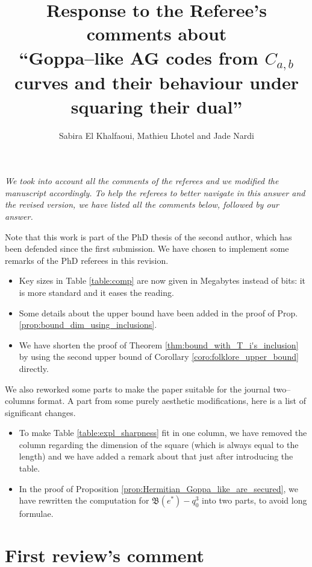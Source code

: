 \documentclass[12pt,a4paper]{amsart}
\title[Goppa--like AG codes from $C_{a,b}$ curves and their behaviour under squaring their dual]{Response to the Referee's comments about  \\ ``Goppa--like AG codes from $C_{a,b}$ curves and their behaviour under squaring their dual''}
\author{Sabira El Khalfaoui, Mathieu Lhotel and Jade Nardi}
\begin{document}
\maketitle

{\itshape
We took into account all the comments of the referees and we modified the manuscript accordingly. To help the referees to better navigate in this answer and the revised version, we have listed all the comments below, followed by our answer.

Note that this work is part of the PhD thesis of the second author, which has been defended since the first submission. We have chosen to implement some remarks of the PhD referees in this revision.
\begin{itemize}
	\item Key sizes in Table \ref{table:comp} are now  given in Megabytes instead of bits: it is more standard and it eases the reading.
	\item Some details about the upper bound have been added in the proof of Prop. \ref{prop:bound_dim_using_inclusions}.
	\item We have shorten the proof of Theorem \ref{thm:bound_with_T_i's_inclusion} by using the second upper bound of Corollary \ref{coro:folklore_upper_bound} directly.
\end{itemize}

\medskip

We also reworked some parts to make the paper suitable for the journal two--columns format. A part from some purely aesthetic modifications, here is a list of significant changes.
\begin{itemize}
	\item To make Table \ref{table:expl_sharpness} fit in one column, we have removed the column regarding the dimension of the square (which is always equal to the length) and we have added a remark about that just after introducing the table.
	\item In the proof of Proposition \ref{prop:Hermitian_Goppa_like_are_secured}, we have rewritten the computation for $\mathfrak{B}(e^*)-q_0^3$ into two parts, to avoid long formulae.
\end{itemize}

}
\section*{First review's comment}
\end{document}
